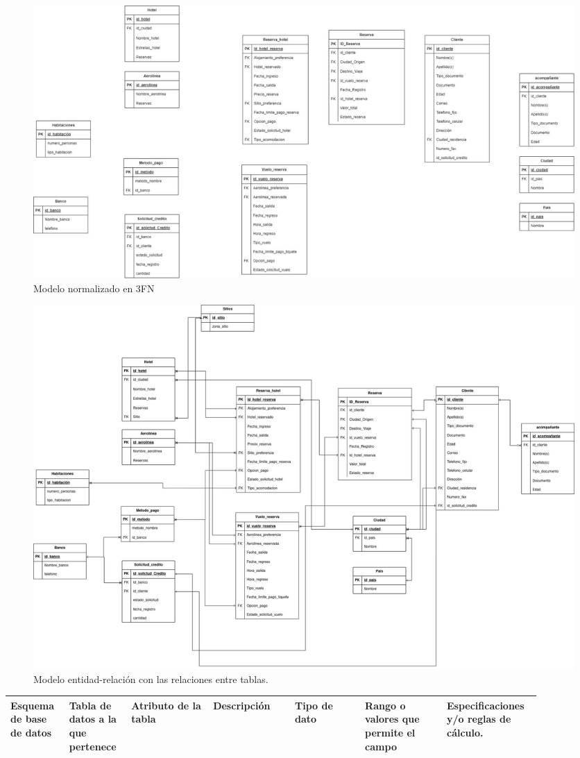 \documentclass{article}
\begin{document}
\begin{landscape}
\begin{figure}[H]
    \centering
    \includegraphics[width=1\linewidth]{img/FN3.png}
    \caption{Modelo normalizado en 3FN}
    \label{fig:Normalizacion3FN}
\end{figure}


\begin{figure}[H]
    \centering
    \includegraphics[width=1\linewidth]{img/ModeloEntidadRelacion.jpg}
    \caption{Modelo entidad-relación con las relaciones entre tablas.}
    \label{fig:EntidadRelacion}
\end{figure}

\newpage


\begin{longtable}{|C{0.102\linewidth}|C{0.102\linewidth}|C{0.142\linewidth}|C{0.142\linewidth}|C{0.122\linewidth}|C{0.142\linewidth}|C{0.142\linewidth}|}
\hline
\textbf{Esquema de base de datos} & \textbf{Tabla de datos a la que pertenece} & \textbf{Atributo de la tabla} & \textbf{Descripción} & \textbf{Tipo de dato} & \textbf{Rango o valores que permite el campo} & \textbf{Especificaciones y/o reglas de cálculo.} \\ \hline


\end{longtable}
\end{landscape}
\end{document}
